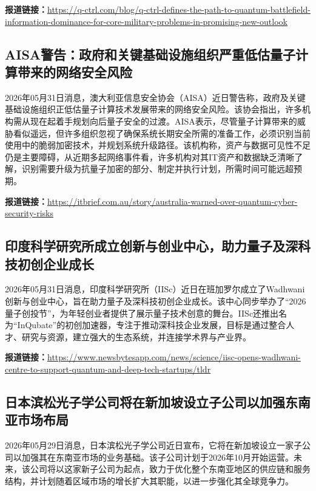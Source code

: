 \documentclass[12pt,a4paper]{ctexart}
\begin{document}
\noindent\textbf{报道链接：}\url{https://q-ctrl.com/blog/q-ctrl-defines-the-path-to-quantum-battlefield-information-dominance-for-core-military-problems-in-promising-new-outlook}

\subsection{ AISA警告：政府和关键基础设施组织严重低估量子计算带来的网络安全风险 }

2026年05月31日消息，澳大利亚信息安全协会（AISA）近日警告称，政府及关键基础设施组织正低估量子计算技术发展带来的网络安全风险。该协会指出，许多机构需从现在起着手规划向后量子安全的过渡。AISA表示，尽管量子计算带来的威胁看似遥远，但许多组织忽视了确保系统长期安全所需的准备工作，必须识别当前使用中的脆弱加密技术，并规划系统升级路径。该机构称，资产与数据可见性不足仍是主要障碍，从近期多起网络事件看，许多机构对其IT资产和数据缺乏清晰了解，识别需要升级为抗量子加密的部分、制定并执行计划，所需时间可能远超预期。

\noindent\textbf{报道链接：}\url{https://itbrief.com.au/story/australia-warned-over-quantum-cyber-security-risks}

\subsection{ 印度科学研究所成立创新与创业中心，助力量子及深科技初创企业成长 }

2026年05月31日消息，印度科学研究所（IISc）近日在班加罗尔成立了Wadhwani创新与创业中心，旨在助力量子及深科技初创企业成长。该中心同步举办了“2026量子创投节”，为年轻创业者提供了展示量子技术创意的舞台。IISc还推出名为“InQubate”的初创加速器，专注于推动深科技企业发展，目标是通过整合人才、研究与资源，建立强大的生态系统，并连接学术界与产业界。

\noindent\textbf{报道链接：}\url{https://www.newsbytesapp.com/news/science/iisc-opens-wadhwani-centre-to-support-quantum-and-deep-tech-startups/tldr}

\subsection{ 日本滨松光子学公司将在新加坡设立子公司以加强东南亚市场布局 }

2026年05月29日消息，日本滨松光子学公司近日宣布，它将在新加坡设立一家子公司以加强其在东南亚市场的业务基础。该子公司计划于2026年10月开始运营。未来，该公司将以这家新子公司为起点，致力于优化整个东南亚地区的供应链和服务结构，并计划随着区域市场的增长扩大其职能，以进一步强化其全球竞争力。
\end{document}
